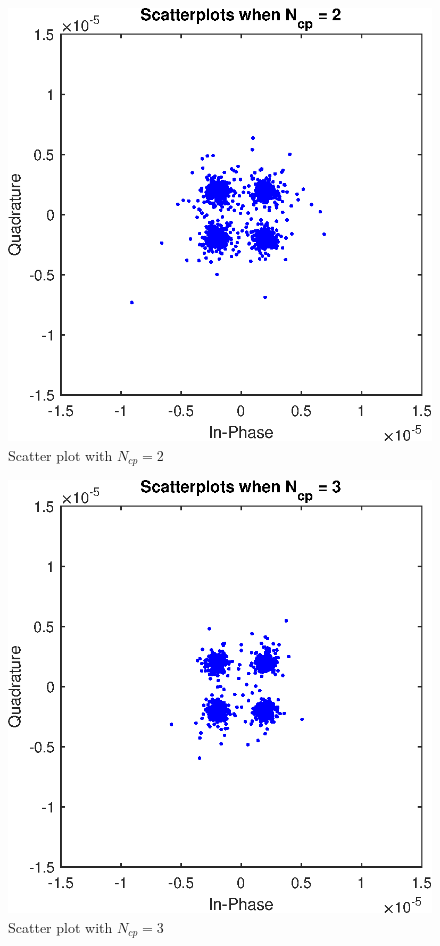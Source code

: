 \documentclass[conference]{IEEEtran}
\begin{document}
\begin{appendices}
\begin{figure}[H]
    \centering
    \includegraphics[width=\linewidth]{images/scatter_Ncp2.eps}
    \caption{Scatter plot with $N_{cp} = 2$}
    \label{Ncp2}
\end{figure}

\begin{figure}[H]
    \centering
    \includegraphics[width=\linewidth]{images/scatter_Ncp3.eps}
    \caption{Scatter plot with $N_{cp} = 3$}
    \label{Ncp3}
\end{figure}


\end{appendices}
\end{document}
